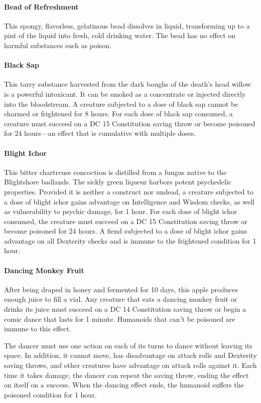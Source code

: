     \paragraph{Bead of Refreshment}
        This spongy, flavorless, gelatinous bead dissolves in liquid, transforming up to a pint of the liquid into fresh, cold drinking water.
        The bead has no effect on harmful substances such as poison.
    \paragraph{Black Sap}
        This tarry substance harvested from the dark boughs of the death's head willow is a powerful intoxicant.
        It can be smoked as a concentrate or injected directly into the bloodstream.
        A creature subjected to a dose of black sap cannot be charmed or frightened for 8 hours.
        For each dose of black sap consumed, a creature must succeed on a DC 15 Constitution saving throw or become poisoned for 24 hours---an effect that is cumulative with multiple doses.
    \paragraph{Blight Ichor}
        This bitter chartreuse concoction is distilled from a fungus native to the Blightshore badlands.
        The sickly green liqueur harbors potent psychedelic properties.
        Provided it is neither a construct nor undead, a creature subjected to a dose of blight ichor gains advantage on Intelligence and Wisdom checks, as well as vulnerability to psychic damage, for 1 hour.
        For each dose of blight ichor consumed, the creature must succeed on a DC 15 Constitution saving throw or become poisoned for 24 hours.
        A fiend subjected to a dose of blight ichor gains advantage on all Dexterity checks and is immune to the frightened condition for 1 hour.
    \paragraph{Dancing Monkey Fruit}
        After being draped in honey and fermented for 10 days, this apple produces enough juice to fill a vial.
        Any creature that eats a dancing monkey fruit or drinks its juice must succeed on a DC 14 Constitution saving throw or begin a comic dance that lasts for 1 minute.
        Humanoids that can't be poisoned are immune to this effect.

        The dancer must use one action on each of its turns to dance without leaving its space.
        In addition, it cannot move, has disadvantage on attack rolls and Dexterity saving throws, and other creatures have advantage on attack rolls against it.
        Each time it takes damage, the dancer can repeat the saving throw, ending the effect on itself on a success.
        When the dancing effect ends, the humanoid suffers the poisoned condition for 1 hour.
